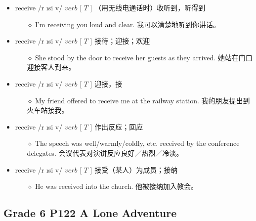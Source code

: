 \documentclass[a4paper,top=2.5cm,buttom=2.5cm10.5pt]{book}
\begin{document}
\begin{itemize}
\item receive /r \i  \textprimstress si \textlengthmark v/ $ verb $ [  $ T $  ] （用无线电通话时）收听到，听得到
\begin{itemize}
\item[$\diamond$] I'm receiving you loud and clear.
我可以清楚地听到你讲话。
\end{itemize}
\end{itemize}
\begin{itemize}
\item receive /r \i  \textprimstress si \textlengthmark v/ $ verb $ [  $ T $  ] 接待；迎接；欢迎
\begin{itemize}
\item[$\diamond$] She stood by the door to receive her guests as they arrived.
她站在门口迎接客人到来。
\end{itemize}
\end{itemize}
\begin{itemize}
\item receive /r \i  \textprimstress si \textlengthmark v/ $ verb $ [  $ T $  ] 迎接，接
\begin{itemize}
\item[$\diamond$] My friend offered to receive me at the railway station.
我的朋友提出到火车站接我。
\end{itemize}
\end{itemize}
\begin{itemize}
\item receive /r \i  \textprimstress si \textlengthmark v/ $ verb $ [  $ T $  ] 作出反应；回应
\begin{itemize}
\item[$\diamond$] The speech was well/warmly/coldly, etc. received by the conference delegates.
会议代表对演讲反应良好／热烈／冷淡。
\end{itemize}
\end{itemize}
\begin{itemize}
\item receive /r \i  \textprimstress si \textlengthmark v/ $ verb $ [  $ T $  ] 接受（某人）为成员；接纳
\begin{itemize}
\item[$\diamond$] He was received into the church.
他被接纳加入教会。
\end{itemize}
\end{itemize}
\textcolor[RGB]{128,0,255}{\section{Grade 6 P122 A Lone Adventure}}
\end{document}
